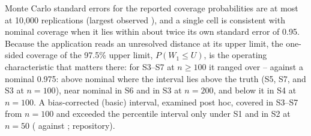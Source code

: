 \documentclass[AMA,Times1COL]{WileyNJDv5}
\begin{document}
Monte Carlo standard errors for the reported coverage probabilities are at most  at 10{,}000 replications (largest observed ), and a single cell is consistent with nominal coverage when it lies within about twice its own standard error of 0.95. Because the application reads an unresolved distance at its upper limit, the one-sided coverage of the 97.5\% upper limit, $P(W_1 \leq U)$, is the operating characteristic that matters there: for S3--S7 at $n \geq 100$ it ranged over -- against a nominal 0.975: above nominal where the interval lies above the truth (S5, S7, and S3 at $n = 100$), near nominal in S6 and in S3 at $n = 200$, and below it in S4 at $n = 100$. A bias-corrected (basic) interval, examined post hoc, covered  in S3--S7 from $n = 100$ and exceeded the percentile interval only under S1 and in S2 at $n = 50$ ( against ; repository).

\end{document}
